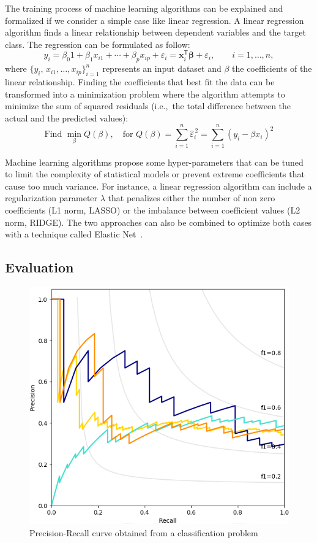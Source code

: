 The training process of machine learning algorithms can be explained and formalized if we consider a simple case like linear regression.
A linear regression algorithm finds a linear relationship between dependent variables and the target class.
The regression can be formulated as follow:
$$y_{i}=\beta _{0}1+\beta _{1}x_{i1}+\cdots +\beta _{p}x_{ip}+\varepsilon _{i}=\mathbf {x} _{i}^{\mathsf {T}}{\boldsymbol {\beta }}+\varepsilon _{i},\qquad i=1,\ldots ,n,$$
where $\{y_{i},\,x_{i1},\ldots ,x_{ip}\}_{i=1}^{n}$ represents an input dataset and $\beta$ the coefficients of the linear relationship.
Finding the coefficients that best fit the data can be transformed into a minimization problem where the algorithm attempts to minimize the sum of squared residuals (i.e.,\ the total difference between the actual and the predicted values):
$${\text{Find }}\min _{\beta }Q(\beta ),\quad {\text{for }}Q(\beta )=\sum _{i=1}^{n}{\widehat {\varepsilon }}_{i}^{\,2}=\sum _{i=1}^{n}(y_{i} - \beta x_{i})^{2}$$

Machine learning algorithms propose some hyper-parameters that can be tuned to limit the complexity of statistical models or prevent extreme coefficients that cause too much variance.
For instance, a linear regression algorithm can include a regularization parameter $\lambda$ that penalizes either the number of non zero coefficients (L1 norm, LASSO) or the imbalance between coefficient values (L2 norm, RIDGE).
The two approaches can also be combined to optimize both cases with a technique called Elastic Net~\cite{zou_regularization_2005}.
\subsection{Evaluation}

\begin{figure}[!ht]
  \centering
        \centering
	\includegraphics[width=0.6\linewidth]{figures/background/pr.png}
	\caption{Precision-Recall curve obtained from a classification problem}
	\label{figure:background:pr}
\end{figure}

